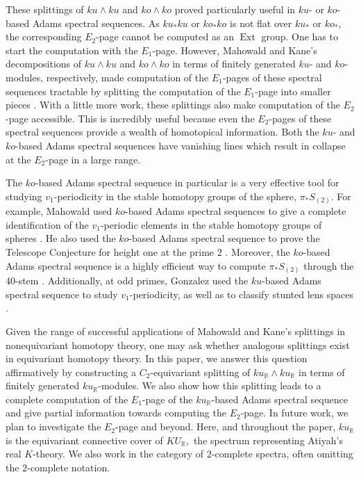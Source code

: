 \documentclass{amsart}
\theoremstyle{plain}
\numberwithin{equation}{section}
\numberwithin{figure}{section}
\DeclareMathOperator{\Ext}{Ext}
\newcommand{\mR}{{\mathbb R}}
\newcommand{\0}{\langle 0 \rangle }
\begin{document}
These splittings of $ku \wedge ku$ and $ko \wedge ko$ proved particularly useful in $ku$- or $ko$-based Adams spectral sequences. As $ku_*ku$ or $ko_*ko$ is not flat over $ku_*$ or $ko_*$, the corresponding $E_2$-page cannot be computed as an $\Ext$ group. One has to start the computation with the $E_1$-page. 
However, Mahowald and Kane's decompositions of $ku \wedge ku$ and $ko \wedge ko$ in terms of finitely generated $ku$- and $ko$-modules, respectively, made computation of the $E_1$-pages of these spectral sequences tractable by splitting the computation of the $E_1$-page into smaller pieces \cite{mahowald1981bo, Davis87, DavisMahowald89, BeaudryBehrensBattacharyaCulverXu20}. With a little more work, these splittings also make computation of the $E_2$-page accessible. This is incredibly useful because even the $E_2$-pages of these spectral sequences provide a wealth of homotopical information. Both the $ku$- and $ko$-based Adams spectral sequences have vanishing lines which result in collapse at the $E_{2}$-page in a large range.

The $ko$-based Adams spectral sequence in particular is a very effective tool for studying $v_{1}$-periodicity in the stable homotopy groups of the sphere, $\pi_{*}S_{(2)}.$ For example, Mahowald used $ko$-based Adams spectral sequences to give a complete identification of the $v_1$-periodic elements in the stable homotopy groups of spheres \cite{Mahowald82}.
He also used the $ko$-based Adams spectral sequence to prove the Telescope Conjecture for height one at the prime $2$ \cite{mahowald1981bo}. Moreover, the $ko$-based Adams spectral sequence is a highly efficient way to compute $\pi_{*}S_{(2)}$ through the $40$-stem \cite{Davis87, DavisMahowald89, BeaudryBehrensBattacharyaCulverXu20}. Additionally, at odd primes, Gonzalez used the $ku$-based Adams spectral sequence to study $v_{1}$-periodicity, as well as to classify stunted lens spaces \cite{Gonzalez00}. 

Given the range of successful applications of Mahowald and Kane's splittings in nonequivariant homotopy theory, one may ask whether analogous splittings exist in equivariant homotopy theory. In this paper, we answer this question affirmatively by constructing a $C_2$-equivariant splitting of $ku_\mR \wedge ku_\mR$ in terms of finitely generated $ku_\mR$-modules. We also show how this splitting leads to a complete computation of the $E_1$-page of the $ku_\mR$-based Adams spectral sequence and give partial information towards computing the $E_2$-page. In future work, we plan to investigate the $E_2$-page and beyond. Here, and throughout the paper, $ku_\mR$ is the equivariant connective cover of $KU_\mathbb{R},$ the spectrum representing Atiyah's real $K$-theory. We also work in the category of $2$-complete spectra, often omitting the $2$-complete notation.
\end{document}
